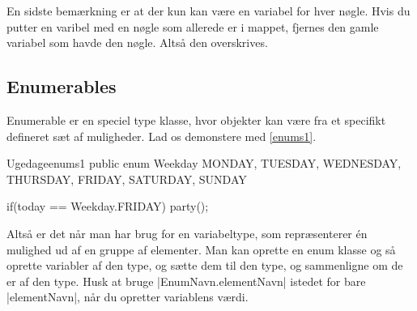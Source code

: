 En sidste bemærkning er at der kun kan være en variabel for hver
nøgle. Hvis du putter en varibel med en nøgle som allerede er i
mappet, fjernes den gamle variabel som havde den nøgle. Altså den
overskrives.


\subsection{Enumerables}

Enumerable er en speciel type klasse, hvor objekter kan være fra et
specifikt defineret sæt af muligheder. Lad os demonstere med
\autoref{enums1}.

\begin{JavaCode}{Ugedage}{enums1}
	public enum Weekday{
		MONDAY,
		TUESDAY,
		WEDNESDAY,
		THURSDAY,
		FRIDAY,
		SATURDAY,
		SUNDAY
	}

	if(today == Weekday.FRIDAY){
		party();
	}
\end{JavaCode}

Altså er det når man har brug for en variabeltype, som repræsenterer
én mulighed ud af en gruppe af elementer. Man kan oprette en enum
klasse og så oprette variabler af den type, og sætte dem til den type,
og sammenligne om de er af den type. Husk at bruge
\JavaInline|EnumNavn.elementNavn| istedet for bare
\JavaInline|elementNavn|, når du opretter variablens værdi.


